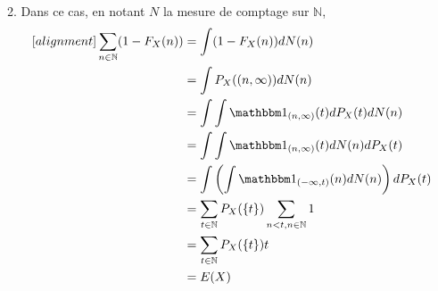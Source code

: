 \documentclass{report}
\begin{document}
2. Dans ce cas, en notant $N$ la mesure de comptage sur $\mathbb N$,
$$ \begin{aligned}[alignment]
\sum_{n\in \mathbb N} (1-F_X(n)) &= \int (1-F_X(n))dN(n) \\
&= \int P_X((n,\infty)) dN(n) \\
&= \int \int \mathbbm 1_{(n,\infty)}(t) dP_X(t) dN(n) \\
&= \int \int \mathbbm 1_{(n,\infty)}(t)  dN(n) dP_X(t)  \\
&= \int \left(\int \mathbbm 1_{(-\infty,t)}(n)  dN(n) \right)dP_X(t) \\
&= \sum_{t\in \mathbb N} P_X(\{t\})\sum_{n< t, n\in \mathbb N} 1 \\
&= \sum_{t\in \mathbb N} P_X(\{t\}) t \\
&= E(X)
\end{aligned}$$
\end{document}

